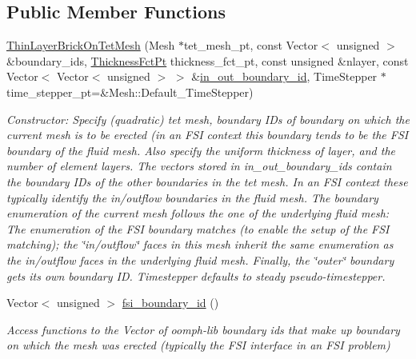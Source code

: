 \subsection*{Public Member Functions}
\begin{DoxyCompactItemize}
\item 
\hyperlink{classoomph_1_1ThinLayerBrickOnTetMesh_ad452469bc94bff203012e68e80ee543c}{Thin\+Layer\+Brick\+On\+Tet\+Mesh} (Mesh $\ast$tet\+\_\+mesh\+\_\+pt, const Vector$<$ unsigned $>$ \&boundary\+\_\+ids, \hyperlink{classoomph_1_1ThinLayerBrickOnTetMesh_aed34f7d1e9a5c6b5f3e220cb5bdf4550}{Thickness\+Fct\+Pt} thickness\+\_\+fct\+\_\+pt, const unsigned \&nlayer, const Vector$<$ Vector$<$ unsigned $>$ $>$ \&\hyperlink{classoomph_1_1ThinLayerBrickOnTetMesh_a3cfd55eb5bbd6801e9d4cd271e602cd8}{in\+\_\+out\+\_\+boundary\+\_\+id}, Time\+Stepper $\ast$time\+\_\+stepper\+\_\+pt=\&Mesh\+::\+Default\+\_\+\+Time\+Stepper)
\begin{DoxyCompactList}\small\item\em Constructor\+: Specify (quadratic) tet mesh, boundary I\+Ds of boundary on which the current mesh is to be erected (in an F\+SI context this boundary tends to be the F\+SI boundary of the fluid mesh. Also specify the uniform thickness of layer, and the number of element layers. The vectors stored in in\+\_\+out\+\_\+boundary\+\_\+ids contain the boundary I\+Ds of the other boundaries in the tet mesh. In an F\+SI context these typically identify the in/outflow boundaries in the fluid mesh. The boundary enumeration of the current mesh follows the one of the underlying fluid mesh\+: The enumeration of the F\+SI boundary matches (to enable the setup of the F\+SI matching); the \char`\"{}in/outflow\char`\"{} faces in this mesh inherit the same enumeration as the in/outflow faces in the underlying fluid mesh. Finally, the \char`\"{}outer\char`\"{} boundary gets its own boundary ID. Timestepper defaults to steady pseudo-\/timestepper. \end{DoxyCompactList}\item 
Vector$<$ unsigned $>$ \hyperlink{classoomph_1_1ThinLayerBrickOnTetMesh_ada2e50ab8dfb631a26fc4111eb2fe9ad}{fsi\+\_\+boundary\+\_\+id} ()
\begin{DoxyCompactList}\small\item\em Access functions to the Vector of oomph-\/lib boundary ids that make up boundary on which the mesh was erected (typically the F\+SI interface in an F\+SI problem) \end{DoxyCompactList}\item 

\end{DoxyCompactItemize}
